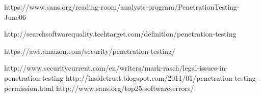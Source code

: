 \documentclass[12pt]{article}
\begin{document}
\newpage
\begin{thebibliography}{1}
     https://www.sans.org/reading-room/analysts-program/PenetrationTesting-June06

        http://searchsoftwarequality.techtarget.com/definition/penetration-testing

     https://aws.amazon.com/security/penetration-testing/

        http://www.securitycurrent.com/en/writers/mark-rasch/legal-issues-in-penetration-testing
     http://insidetrust.blogspot.com/2011/01/penetration-testing-permission.html
        http://www.sans.org/top25-software-errors/
\end{thebibliography}
\end{document}
